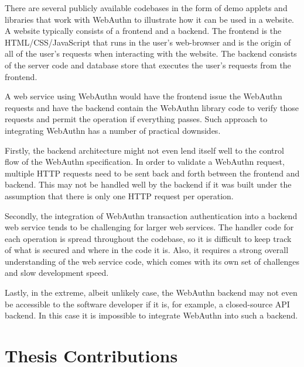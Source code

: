 
There are several publicly available codebases in the form of demo applets and libraries that work with WebAuthn \cite{webauthn-online-examples} to illustrate how it can be used in a website. A website typically consists of a frontend and a backend. The frontend is the HTML/CSS/JavaScript that runs in the user's web-browser and is the origin of all of the user's requests when interacting with the website. The backend consists of the server code and database store that executes the user's requests from the frontend. 

A web service using WebAuthn would have the frontend issue the WebAuthn requests and have the backend contain the WebAuthn library code to verify those requests and permit the operation if everything passes. Such approach to integrating WebAuthn has a number of practical downsides. 


Firstly, the backend architecture might not even lend itself well to the control flow of the WebAuthn specification. In order to validate a WebAuthn request, multiple HTTP requests need to be sent back and forth between the frontend and backend. This may not be handled well by the backend if it was built under the assumption that there is only one HTTP request per operation.

Secondly, the integration of WebAuthn transaction authentication into a backend web service tends to be challenging for larger web services. The handler code for each operation is spread throughout the codebase, so it is difficult to keep track of what is secured and where in the code it is. Also, it requires a strong overall understanding of the web service code, which comes with its own set of challenges and slow development speed.

Lastly, in the extreme, albeit unlikely case, the WebAuthn backend may not even be accessible to the software developer if it is, for example, a closed-source API backend. In this case it is impossible to integrate WebAuthn into such a backend.

\section{Thesis Contributions}

